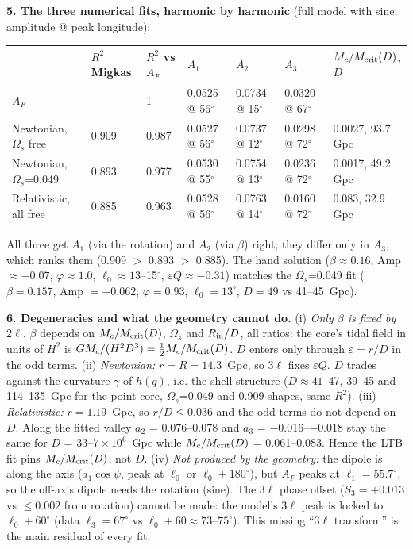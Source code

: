 \documentclass[10pt]{article}
\begin{document}
{\textbf{5. The three numerical fits, harmonic by harmonic} (full model with sine; amplitude @ peak longitude):
\begin{center}\footnotesize\setlength{\tabcolsep}{4pt}\begin{tabular}{lllllll}\toprule
 & $R^2$ Migkas & $R^2$ vs $A_F$ & $A_1$ & $A_2$ & $A_3$ & $M_c/M_{\rm crit}(D)$, $D$\\\midrule
$A_F$ & -- & 1 & 0.0525 @ 56$^\circ$ & 0.0734 @ 15$^\circ$ & 0.0320 @ 67$^\circ$ & --\\
Newtonian, $\Omega_s$ free & 0.909 & 0.987 & 0.0527 @ 56$^\circ$ & 0.0737 @ 12$^\circ$ & 0.0298 @ 72$^\circ$ & 0.0027, 93.7 Gpc\\
Newtonian, $\Omega_s$=0.049 & 0.893 & 0.977 & 0.0530 @ 55$^\circ$ & 0.0754 @ 13$^\circ$ & 0.0236 @ 72$^\circ$ & 0.0017, 49.2 Gpc\\
Relativistic, all free & 0.885 & 0.963 & 0.0528 @ 56$^\circ$ & 0.0763 @ 14$^\circ$ & 0.0160 @ 72$^\circ$ & 0.083, 32.9 Gpc\\\bottomrule
\end{tabular}\end{center}
\vspace{-4pt}
All three get $A_1$ (via the rotation) and $A_2$ (via $\beta$) right; they differ only in $A_3$, which ranks them (0.909 $>$ 0.893 $>$ 0.885). The hand solution ($\beta\approx0.16$, Amp $\approx-0.07$, $\varphi\approx1.0$, $\ell_0\approx13$--15$^\circ$, $\varepsilon Q\approx-0.31$) matches the $\Omega_s$=0.049 fit ($\beta=0.157$, Amp $=-0.062$, $\varphi=0.93$, $\ell_0=13^\circ$, $D=49$ vs 41--45~Gpc).

\textbf{6. Degeneracies and what the geometry cannot do.}
(i) \emph{Only $\beta$ is fixed by $2\ell$.} $\beta$ depends on $M_c/M_{\rm crit}(D)$, $\Omega_s$ and $R_{\rm in}/D$, all ratios: the core's tidal field in units of $H^2$ is $GM_c/(H^2D^3)=\frac12M_c/M_{\rm crit}(D)$. $D$ enters only through $\varepsilon=r/D$ in the odd terms.
(ii) \emph{Newtonian:} $r=R=14.3$~Gpc, so $3\ell$ fixes $\varepsilon Q$. $D$ trades against the curvature $\gamma$ of $h(q)$, i.e. the shell structure ($D\approx41$--47, 39--45 and 114--135~Gpc for the point-core, $\Omega_s$=0.049 and 0.909 shapes, same $R^2$).
(iii) \emph{Relativistic:} $r=1.19$~Gpc, so $r/D\le0.036$ and the odd terms do not depend on $D$. Along the fitted valley $a_2$ = 0.076--0.078 and $a_3$ = $-$0.016--$-$0.018 stay the same for $D$ = 33--$7\times10^6$~Gpc while $M_c/M_{\rm crit}(D)$ = 0.061--0.083. Hence the LTB fit pins $M_c/M_{\rm crit}(D)$, not $D$.
(iv) \emph{Not produced by the geometry:} the dipole is along the axis ($a_1\cos\psi$, peak at $\ell_0$ or $\ell_0+180^\circ$), but $A_F$ peaks at $\ell_1=55.7^\circ$, so the off-axis dipole needs the rotation (sine). The $3\ell$ phase offset ($S_3=+0.013$ vs $\le0.002$ from rotation) cannot be made: the model's $3\ell$ peak is locked to $\ell_0+60^\circ$ (data $\ell_3=67^\circ$ vs $\ell_0+60\approx73$--$75^\circ$). This missing ``$3\ell$ transform'' is the main residual of every fit.

}
\end{document}
